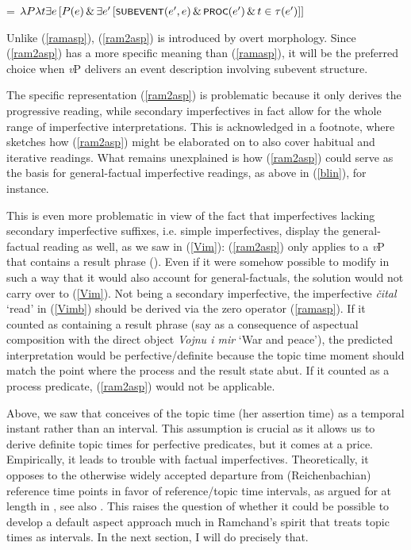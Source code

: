 \documentclass[output=paper,colorlinks,citecolor=brown]{langscibook}
\begin{document}
\ea
\label{ram2asp} 
 = $\lambda P \lambda t \exists e \,[ P(e) 
\,\&\, \exists e'\,[\cnst{Subevent}(e',e)\,\&\,\cnst{Proc}(e')\,\&\, t \in \tau(e')]]$
\z

Unlike (\ref{ramasp}), (\ref{ram2asp}) is introduced by overt 
morphology. Since (\ref{ram2asp}) has a more specific meaning than (\ref{ramasp}), it will be the preferred choice when
\textit{v}P delivers an event description involving subevent structure.

The specific representation (\ref{ram2asp}) is problematic because it only derives the progressive reading, while secondary imperfectives in fact allow for the whole range of imperfective interpretations. This is acknowledged in a footnote, where 
\citet[1704]{Ramchand2004} sketches how (\ref{ram2asp}) might be elaborated on to also cover habitual and iterative readings. What remains unexplained is how (\ref{ram2asp}) could serve as the basis for general-factual imperfective readings, as above in (\ref{blin}), for instance. 

This is even more problematic in view of the fact that imperfectives lacking secondary imperfective suffixes, i.e. simple imperfectives, display the general-factual reading as well, as we saw in (\ref{Vim}): (\ref{ram2asp}) only applies to a \textit{v}P that contains a result phrase (\citealt[1704]{Ramchand08}). Even if it were somehow possible to modify  in such a way that it would also account for general-factuals, the solution would not carry over to (\ref{Vim}).
Not being a secondary imperfective, the imperfective \textit{čital} `read' in (\ref{Vimb}) should be derived via the zero operator (\ref{ramasp}). If it counted as containing a result phrase (say as a consequence of aspectual composition with the direct object \textit{Vojnu i mir} `War and peace'), the predicted interpretation would be perfective/definite because the topic time moment should match the point where the process and the result state abut. If it counted as a process predicate, (\ref{ram2asp}) would not be applicable.

Above, we saw that \citet{Ramchand08} conceives of the topic time (her assertion time) as a temporal instant rather than an interval. 
This assumption is crucial as it allows us to derive definite topic times for perfective predicates, but it comes at a price. Empirically, it 
leads to trouble with factual imperfectives. Theoretically, it opposes to the otherwise widely accepted departure from (Reichenbachian) reference time points in favor of reference/topic time intervals, as argued for at length in \citet{Klein1994}, see also \citet[314]{Paslawska.Stechow2003}. This raises the question of whether it could be possible to develop a default aspect approach much in Ramchand's spirit that treats topic times as intervals. In the next section, I will do precisely that.
\end{document}
